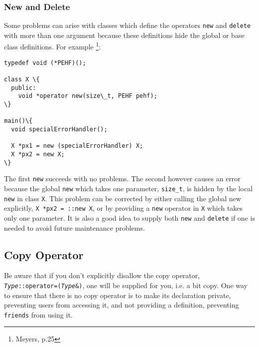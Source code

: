 \subsubsection{New and Delete}
Some problems can arise with classes which define the operators \texttt{new} and
\texttt{delete} with more than one argument because these definitions hide
the global or base class definitions. For example \footnote{Meyers, p.25}:
\begin{verbatim}
typedef void (*PEHF)();

class X \{
  public:
    void *operator new(size\_t, PEHF pehf);
\}

main()\{
  void specialErrorHandler();

  X *px1 = new (specialErrorHandler) X; 
  X *px2 = new X;
\}
\end{verbatim}
\noindent
The first \texttt{new} succeeds with no problems. The second however causes an
error because the global \texttt{new} which takes one parameter, \texttt{size\_t},
is hidden by the local \texttt{new} in class \texttt{X}. This problem can be
corrected by either calling the global new explicitly, \texttt{X *px2 = ::new X},
or by providing a \texttt{new} operator in \texttt{X} which takes only one
parameter. It is also a good idea to supply both \texttt{new} and 
\texttt{delete} if one is needed to avoid future maintenance problems.

\subsection{Copy Operator}
Be aware that if you don't explicitly disallow the copy operator, 
\texttt{\emph{Type}::operator=(\emph{Type}\&)}, one will be supplied for
you, i.e. a bit copy. One way to ensure that there is no copy operator
is to make its declaration private, preventing users from accessing it, and not
providing a definition, preventing \texttt{friends} from using it.


